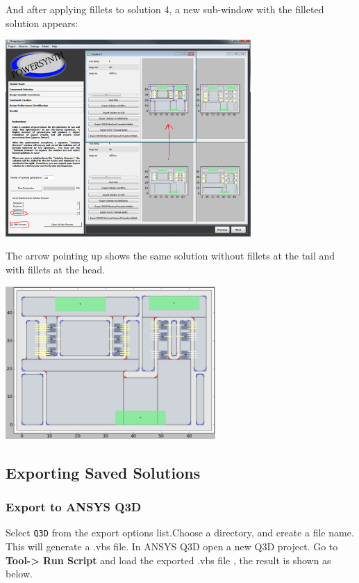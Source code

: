 \documentclass[11pt]{article}
\begin{document}
And after applying fillets to solution 4, a new sub-window with the filleted solution appears:

\begin{center}
\includegraphics[width=0.7\textwidth]{./figs/42_PL2.png}
\end{center}

The arrow pointing up shows the same solution without fillets at the tail and with fillets at the head. 

\begin{center}
\includegraphics[width=0.6\textwidth]{./figs/43_PL3.png}
\end{center}

\pagebreak

\subsection{Exporting Saved Solutions}
\label{sec-2-8}

\subsubsection{Export to ANSYS Q3D}
\label{sec-2-8-1}

Select \texttt{Q3D} from the export options list.Choose a directory, and create a file name. This will generate a .vbs file. In ANSYS Q3D open a new Q3D project. Go to \textbf{Tool-> Run Script} and load the exported .vbs file , the result is shown as below.
\end{document}
